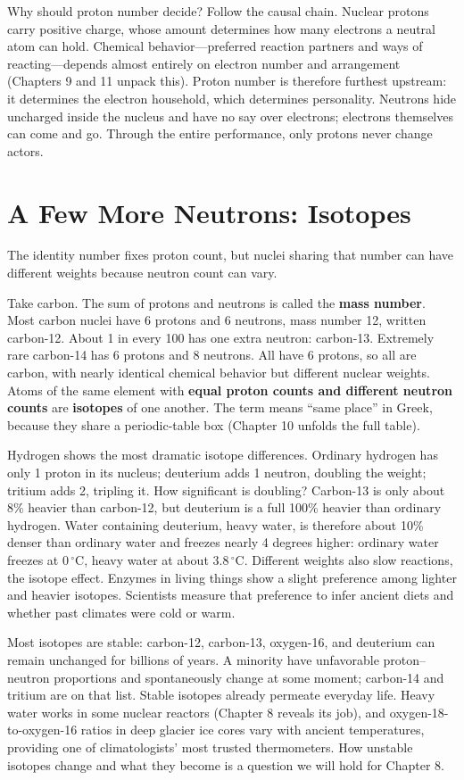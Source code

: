 Why should proton number decide? Follow the causal chain. Nuclear protons carry positive charge, whose amount determines how many electrons a neutral atom can hold. Chemical behavior---preferred reaction partners and ways of reacting---depends almost entirely on electron number and arrangement (Chapters 9 and 11 unpack this). Proton number is therefore furthest upstream: it determines the electron household, which determines personality. Neutrons hide uncharged inside the nucleus and have no say over electrons; electrons themselves can come and go. Through the entire performance, only protons never change actors.

\section{A Few More Neutrons: Isotopes}

The identity number fixes proton count, but nuclei sharing that number can have different weights because neutron count can vary.

Take carbon. The sum of protons and neutrons is called the \textbf{mass number}. Most carbon nuclei have 6 protons and 6 neutrons, mass number 12, written carbon-12. About 1 in every 100 has one extra neutron: carbon-13. Extremely rare carbon-14 has 6 protons and 8 neutrons. All have 6 protons, so all are carbon, with nearly identical chemical behavior but different nuclear weights. Atoms of the same element with \textbf{equal proton counts and different neutron counts} are \textbf{isotopes} of one another. The term means ``same place'' in Greek, because they share a periodic-table box (Chapter 10 unfolds the full table).

Hydrogen shows the most dramatic isotope differences. Ordinary hydrogen has only 1 proton in its nucleus; deuterium adds 1 neutron, doubling the weight; tritium adds 2, tripling it. How significant is doubling? Carbon-13 is only about 8\% heavier than carbon-12, but deuterium is a full 100\% heavier than ordinary hydrogen. Water containing deuterium, heavy water, is therefore about 10\% denser than ordinary water and freezes nearly 4 degrees higher: ordinary water freezes at $0\,^{\circ}\mathrm{C}$, heavy water at about $3.8\,^{\circ}\mathrm{C}$. Different weights also slow reactions, the isotope effect. Enzymes in living things show a slight preference among lighter and heavier isotopes. Scientists measure that preference to infer ancient diets and whether past climates were cold or warm.

Most isotopes are stable: carbon-12, carbon-13, oxygen-16, and deuterium can remain unchanged for billions of years. A minority have unfavorable proton--neutron proportions and spontaneously change at some moment; carbon-14 and tritium are on that list. Stable isotopes already permeate everyday life. Heavy water works in some nuclear reactors (Chapter 8 reveals its job), and oxygen-18-to-oxygen-16 ratios in deep glacier ice cores vary with ancient temperatures, providing one of climatologists' most trusted thermometers. How unstable isotopes change and what they become is a question we will hold for Chapter 8.


